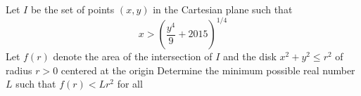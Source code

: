 Let $I$ be the set of points $(x,y)$ in the Cartesian plane such that $$x>\left(\frac{y^4}{9}+2015\right)^{1/4}$$Let $f(r)$ denote the area of the intersection of $I$ and the disk $x^2+y^2\le r^2$ of radius $r>0$ centered at the origin  Determine the minimum possible real number $L$ such that $f(r)<Lr^2$ for all 
